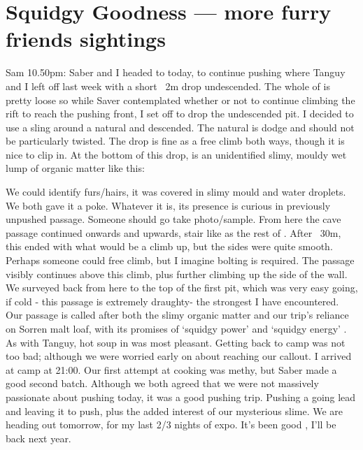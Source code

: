 \section{Squidgy Goodness --- more furry friends sightings}
\begin{marginfigure}
\end{marginfigure}


Sam 10.50pm: Saber and I headed to  today, to continue pushing where Tanguy and I left off last week with a short ~2m drop undescended. The whole of  is pretty loose so while Saver contemplated whether or not to continue climbing the rift to reach the pushing front, I set off to drop the undescended pit.
I decided to use a sling around a natural and descended. The natural is dodge and should not be particularly twisted. The drop is fine as a free climb both ways, though it is nice to clip in. At the bottom of this drop, is an unidentified slimy, mouldy wet lump of organic matter like this: 

We could identify furs/hairs, it was covered in slimy mould and water droplets. We both gave it a poke. Whatever it is, its presence is curious in previously unpushed passage. Someone should go take photo/sample.
From here the cave passage continued onwards and upwards, stair like as the rest of . After ~30m, this ended with what would be a climb up, but the sides were quite smooth. Perhaps someone could free climb, but I imagine bolting is required. The passage visibly continues above this climb, plus further climbing up the side of the wall. We surveyed back from here to  the top of the first pit, which was very easy going, if cold  - this passage is extremely draughty- the strongest I have encountered. Our passage is called   after both the slimy organic matter and our trip’s reliance on Sorren malt loaf, with its promises of ‘squidgy power’ and ‘squidgy energy’ . As with Tanguy, hot soup in  was most pleasant.
Getting back to camp was not too bad; although we were worried early on about reaching our callout. I arrived at camp at 21:00. Our first attempt at cooking was methy, but Saber made a good second batch. Although we both agreed that we were not massively passionate about pushing today, it was a good pushing trip. Pushing a going lead and leaving it to push, plus the added interest of our mysterious slime.
We are heading out tomorrow, for my last 2/3 nights of expo. It’s been good , I’ll be back next year.


